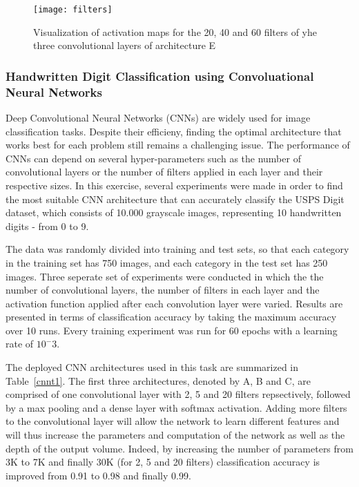 \documentclass[conference,compsoc]{IEEEtran}
\begin{document}
  
  
\begin{figure*}
\texttt{[image: filters]}
        \caption{Visualization of activation maps for the 20, 40 and 60 filters of yhe three convolutional layers of architecture E}
\label{fig:filters}
\end{figure*}
  
  
  
  
  
  
  
  
  
\subsubsection{Handwritten Digit Classification using Convoluational Neural Networks}
Deep Convolutional Neural Networks (CNNs) are widely used for image classification tasks. Despite their efficieny, finding the optimal architecture that works best for each problem still remains a challenging issue. The performance of CNNs can depend on several hyper-parameters such as the number of convolutional layers or the number of filters applied in each layer and their respective sizes. In this exercise, several experiments were made in order to find the most suitable CNN architecture that can accurately classify the USPS Digit dataset, which consists of 10.000 grayscale images, representing 10 handwritten digits - from 0 to 9. 

The data was randomly divided into training and test sets, so that each category in the training set has 750 images, and each category in the test set has 250 images. Three seperate set of experiments were conducted in which the the number of convolutional layers, the number of filters in each layer and the activation function applied after each convolution layer were varied. Results are presented in terms of classification accuracy by taking the maximum accuracy over 10 runs. Every training experiment was run for 60 epochs with a learning rate of $10^-3$. 

The deployed CNN architectures used in this task are summarized in Table~\ref{cnnt1}. The first three architectures, denoted by A, B and C, are comprised of one convolutional layer with 2, 5 and 20 filters repsectively, followed by a max pooling and a dense layer with softmax activation. Adding more filters to the convolutional layer will allow the network to learn different features and will thus increase the parameters and computation of the network as well as the depth of the output volume. Indeed, by increasing the number of parameters from 3K to 7K and finally 30K (for 2, 5 and 20 filters) classification accuracy is improved from 0.91 to 0.98 and finally 0.99.
\end{document}
